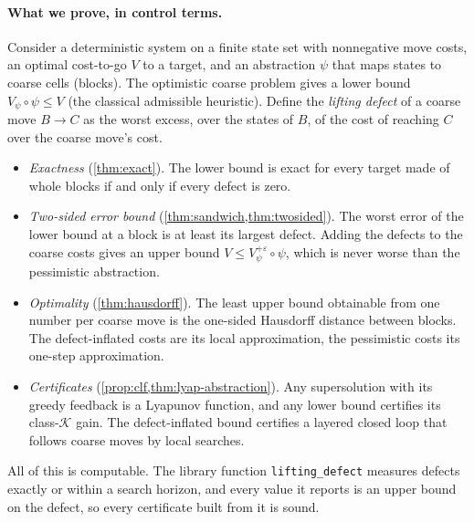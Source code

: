 \documentclass[11pt]{article}
\theoremstyle{definition}
\theoremstyle{remark}
\newcommand{\eps}{\varepsilon}
\begin{document}
\paragraph{What we prove, in control terms.}
Consider a deterministic system on a finite state set with nonnegative move
costs, an optimal cost-to-go $V$ to a target, and an abstraction $\psi$ that maps
states to coarse cells (blocks). The optimistic coarse problem gives a lower bound
$V_\psi \circ \psi \le V$ (the classical admissible heuristic). Define the
\emph{lifting defect} of a coarse move $B \to C$ as the worst excess, over the
states of $B$, of the cost of reaching $C$ over the coarse move's cost.
\begin{itemize}
\item \emph{Exactness} (\cref{thm:exact}). The lower bound is exact for every
  target made of whole blocks if and only if every defect is zero.
\item \emph{Two-sided error bound} (\cref{thm:sandwich,thm:twosided}). The worst
  error of the lower bound at a block is at least its largest defect. Adding the
  defects to the coarse costs gives an upper bound $V \le V^{+\eps}_\psi \circ \psi$,
  which is never worse than the pessimistic abstraction.
\item \emph{Optimality} (\cref{thm:hausdorff}). The least upper bound obtainable
  from one number per coarse move is the one-sided Hausdorff distance between
  blocks. The defect-inflated costs are its local approximation, the pessimistic
  costs its one-step approximation.
\item \emph{Certificates} (\cref{prop:clf,thm:lyap-abstraction}). Any supersolution
  with its greedy feedback is a Lyapunov function, and any lower bound certifies
  its class-$\mathcal K$ gain. The defect-inflated bound certifies a layered
  closed loop that follows coarse moves by local searches.
\end{itemize}
All of this is computable. The library function \texttt{lifting\_defect} measures
defects exactly or within a search horizon, and every value it reports is an upper
bound on the defect, so every certificate built from it is sound.
\end{document}
